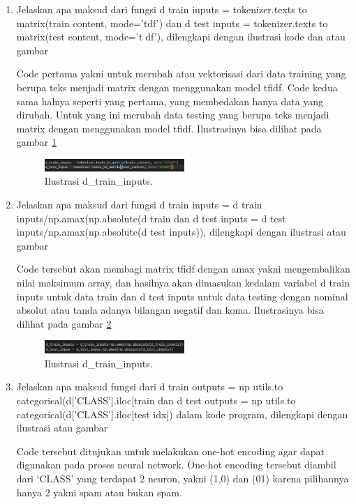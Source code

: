 \begin{enumerate}
\item Jelaskan apa maksud dari fungsi d train inputs = tokenizer.texts to matrix(train content, mode='tdf') dan d test inputs = tokenizer.texts to matrix(test content, mode='tdf'), dilengkapi dengan ilustrasi kode dan atau gambar \par
Code pertama yakni untuk merubah atau vektorisasi dari data training yang berupa teks menjadi matrix dengan menggunakan model tfidf. Code kedua sama halnya seperti yang pertama, yang membedakan hanya data yang dirubah. Untuk yang ini merubah data testing yang berupa teks menjadi matrix dengan menggunakan model tfidf. Ilustrasinya bisa dilihat pada gambar \ref{toke6}
		\begin{figure}[!htbp]
		\centerline{\includegraphics[width=0.5\textwidth]{figures/im/toke6.png}}
		\caption{Ilustrasi d\_train\_inputs.}
		\label{toke6}
		\end{figure}

\item Jelaskan apa maksud dari fungsi d train inputs = d train inputs/np.amax(np.absolute(d train dan d test inputs = d test inputs/np.amax(np.absolute(d test inputs)), dilengkapi dengan ilustrasi atau gambar \par
Code tersebut akan membagi matrix tfidf dengan amax yakni mengembalikan nilai maksimum array, dan hasilnya akan dimasukan kedalam variabel d train inputs untuk data train dan d test inputs untuk data testing dengan nominal absolut atau tanda adanya bilangan negatif dan koma. Ilustrasinya bisa dilihat pada gambar \ref{toke7}
		\begin{figure}[!htbp]
		\centerline{\includegraphics[width=0.5\textwidth]{figures/im/toke7.png}}
		\caption{Ilustrasi d\_train\_inputs.}
		\label{toke7}
		\end{figure}

\item Jelaskan apa maksud fungsi dari d train outputs = np utils.to categorical(d['CLASS'].iloc[train dan d test outputs = np utils.to categorical(d['CLASS'].iloc[test idx]) dalam kode program, dilengkapi dengan ilustrasi atau gambar \par
Code tersebut ditujukan untuk melakukan one-hot encoding agar dapat digunakan pada proses neural network. One-hot encoding tersebut diambil dari `CLASS' yang terdapat 2 neuron, yakni (1,0) dan (01) karena pilihannya hanya 2 yakni spam atau bukan spam.


\end{enumerate}

